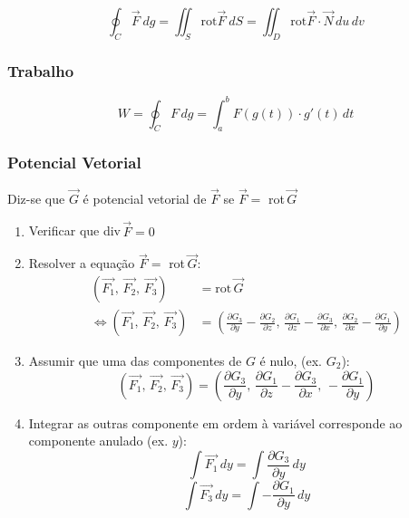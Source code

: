 \documentclass[11pt, a4paper]{article}
\begin{document}
\begin{equation*}
    \oint_C \vec{F} \ dg =
    \iint_S \text{rot} \vec{F} \ dS =
    \iint_D \text{rot} \vec{F} \cdot \vec{N} \, du\,dv
\end{equation*}

\subsubsection{Trabalho}
\begin{equation*}
    W = \oint_C F \, dg =
    \int_{a}^{b} F\left(g(t)\right) \cdot g'(t) \, dt
\end{equation*}

\subsubsection{Potencial Vetorial}

Diz-se que $\vec{G}$ é potencial vetorial de $\vec{F}$ se $\vec{F} =$ rot\,$\vec{G}$

\begin{enumerate}
    \item Verificar que div\,$\vec{F} = 0$
    \item Resolver a equação $\vec{F} =$ rot\,$\vec{G}$:
          \begin{align*}
              \left(\vec{F_1},\,\vec{F_2},\,\vec{F_3}\right) & = \text{rot}\,\vec{G}
              \\ \Leftrightarrow
              \left(\vec{F_1},\,\vec{F_2},\,\vec{F_3}\right) & =
              \left(\frac{\partial G_3}{\partial y} - \frac{\partial G_2}{\partial z}
              ,\,\frac{\partial G_1}{\partial z} - \frac{\partial G_3}{\partial x}
              ,\,\frac{\partial G_2}{\partial x} - \frac{\partial G_1}{\partial y}
              \right)
          \end{align*}
    \item Assumir que uma das componentes de $G$ é nulo, (ex. $G_2$):
          \begin{equation*}
              \left(\vec{F_1},\,\vec{F_2},\,\vec{F_3}\right) =
              \left(\frac{\partial G_3}{\partial y}
              ,\,\frac{\partial G_1}{\partial z} - \frac{\partial G_3}{\partial x}
              ,\, - \frac{\partial G_1}{\partial y}
              \right)
          \end{equation*}
    \item Integrar as outras componente em ordem à variável corresponde ao
          componente anulado (ex. $y$):
          \begin{equation*}
              \int \vec{F_1} \,dy = \int \frac{\partial G_3}{\partial y} \,dy
          \end{equation*}
          \begin{equation*}
              \int \vec{F_3} \,dy = \int -\frac{\partial G_1}{\partial y} \,dy
          \end{equation*}
\end{enumerate}
\end{document}
